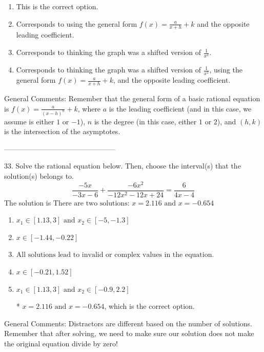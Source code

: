 \documentclass{extbook}[14pt]
\begin{document}
\begin{enumerate}[label=\Alph*.] 
\item This is the correct option.  
\item Corresponds to using the general form $f(x) = \frac{a}{x+h}+k$ and the opposite leading coefficient.  
\item Corresponds to thinking the graph was a shifted version of $\frac{1}{x^2}$.  
\item Corresponds to thinking the graph was a shifted version of $\frac{1}{x^2}$, using the general form $f(x) = \frac{a}{x+h}+k$, and the opposite leading coefficient.  
\end{enumerate} 
 
General Comments: Remember that the general form of a basic rational equation is $ f(x) = \frac{a}{(x-h)^n} + k$, where $a$ is the leading coefficient (and in this case, we assume is either $1$ or $-1$), $n$ is the degree (in this case, either $1$ or $2$), and $(h, k)$ is the intersection of the asymptotes.

-----------------------------------------------

33. Solve the rational equation below. Then, choose the interval(s) that the solution(s) belongs to.
\[ \frac{-5x}{-3x -6} + \frac{-6x^{2}}{-12x^{2} -12 x + 24} = \frac{6}{4x -4} \] 
The solution is $ \text{There are two solutions: } x = 2.116 \text{ and } x = -0.654 $ 

\begin{enumerate}[label=\Alph*.] 
\item $ x_1 \in [1.13, 3] \text{ and } x_2 \in [-5,-1.3] $ 

  
\item $ x \in [-1.44,-0.22] $ 

  
\item $ \text{All solutions lead to invalid or complex values in the equation.} $ 

  
\item $ x \in [-0.21,1.52] $ 

  
\item $ x_1 \in [1.13, 3] \text{ and } x_2 \in [-0.9,2.2] $ 

 * $x = 2.116 \text{ and } x = -0.654$, which is the correct option. 
\end{enumerate} 
 
General Comments: Distractors are different based on the number of solutions. Remember that after solving, we need to make sure our solution does not make the original equation divide by zero!
\end{document}
